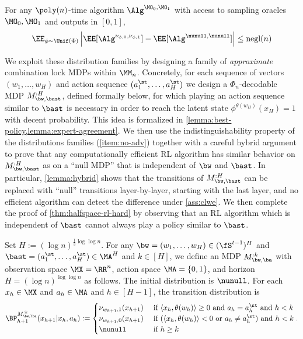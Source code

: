 \begin{assumption}
For any $\poly(n)$-time algorithm $\Alg^{\MO_0,\MO_1}$ with access to sampling oracles $\MO_0, \MO_1$ and outputs in $[0,1]$,
\[\EE_{\phi\sim\Unif(\Phi)} \left| \EE[\Alg^{\nu_{\phi,0},\nu_{\phi,1}}] - \EE[\Alg^{\nunull,\nunull}]\right| \leq \textrm{negl}(n)\]
\end{assumption}
\fi

We exploit these distribution families by designing a family of \emph{approximate} combination lock MDPs within $\MM_n$. Concretely, for each sequence of vectors $(w_1,\dots,w_H)$ and action sequence $(a^\st_1,\dots,a^\st_H)$ we design a $\Phi_n$-decodable MDP $M^{:H}_{\bw,\bast}$, defined formally below, for which playing an action sequence similar to $\bast$ is necessary in order to reach the latent state $\phi^{\theta(w_H)}(x_H) = 1$ with decent probability. This idea is formalized in \cref{lemma:best-policy,lemma:expert-agreement}. We then use the indistinguishability property of the distributions families (\cref{item:no-adv}) together with a careful hybrid argument to prove that any computationally efficient RL algorithm has similar behavior on $M^{:H}_{\bw,\bast}$ as on a ``null MDP'' that is independent of $\bw$ and $\bast$. In particular,  \cref{lemma:hybrid} shows that the transitions of $M^{:H}_{\bw,\bast}$ can be replaced with ``null'' transitions layer-by-layer, starting with the last layer, and no efficient algorithm can detect the difference under \cref{ass:clwe}. We then complete the proof of \cref{thm:halfspace-rl-hard} by observing that an RL algorithm which is independent of $\bast$ cannot always play a policy similar to $\bast$.

\begin{definition}
Set $H := (\log n)^{\frac{1}{3}\log \log n}$. For any $\bw = (w_1,\dots,w_H) \in (\fS^{t-1})^H$ and $\bast = (a^\st_1,\dots,a^\st_H) \in \MA^H$ and $k \in [H]$, we define an MDP $M_{\bw,\ba}^{:k}$ with observation space $\MX=\RR^n$, action space $\MA=\{0,1\}$, and horizon $H = (\log n)^{\log \log n}$ as follows. The initial distribution is $\nunull$. For each $x_h \in \MX$ and $a_h \in \MA$ and $h \in [H-1]$, the transition distribution is
\[\BP_{h+1}^{M_{\bw,\ba}^{:k}}(x_{h+1}|x_h,a_h) := \begin{cases} 
\nu_{w_{h+1}, 1}(x_{h+1}) & \text{ if } \langle x_h,\theta(w_h)\rangle \geq 0 \text{ and } a_h = a^\st_h \text{ and } h < k\\ 
\nu_{w_{h+1}, 0}(x_{h+1}) & \text{ if } (\langle x_h,\theta(w_h)\rangle<0 \text{ or } a_h \neq a^\st_h) \text{ and } h < k \\
\nunull & \text{ if } h \geq k
\end{cases}.
\]
\end{definition}

